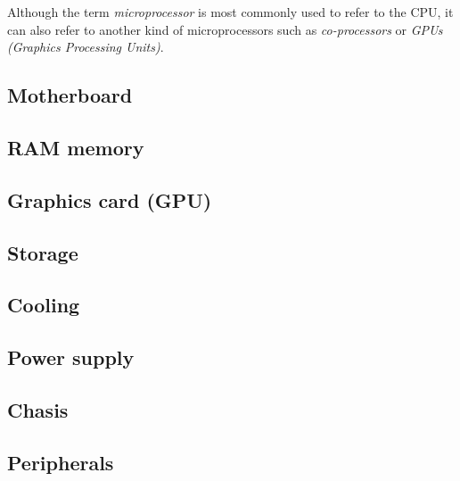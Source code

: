 \documentclass[a4paper, twoside, 11pt]{article}
\begin{document}
\hspace{\parindent} Although the term \textit{microprocessor} is most commonly used to refer to the CPU, it can also refer to another kind  of microprocessors such as \textit{co-processors} or \textit{GPUs (Graphics Processing Units)}.



\subsection{Motherboard}


\subsection{RAM memory}



\subsection{Graphics card (GPU)}


\subsection{Storage}

\subsection{Cooling}


\subsection{Power supply}


\subsection{Chasis}


\subsection{Peripherals}
\end{document}
